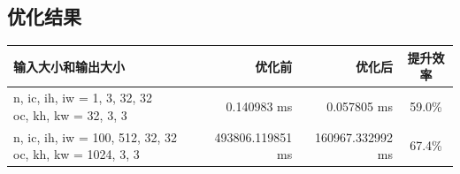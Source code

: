 \documentclass[UTF8]{ctexart}
\begin{document}
\subsection*{优化结果}
\begin{table}[H]
    \begin{tabular}{m{17em}rrc}
        \toprule
        输入大小和输出大小 & 优化前 & 优化后 & 提升效率 \\
        \midrule
        \ttfamily
        n, ic, ih, iw = 1, 3, 32, 32~~~~~
        oc, kh, kw = 32, 3, 3
        & 0.140983 ms & 0.057805 ms & 59.0\%\\
        \hline
        \ttfamily
        n, ic, ih, iw = 100, 512, 32, 32
        oc, kh, kw = 1024, 3, 3
        & 493806.119851 ms & 160967.332992 ms & 67.4\%\\
        \bottomrule
    \end{tabular}
\end{table}




\end{document}
